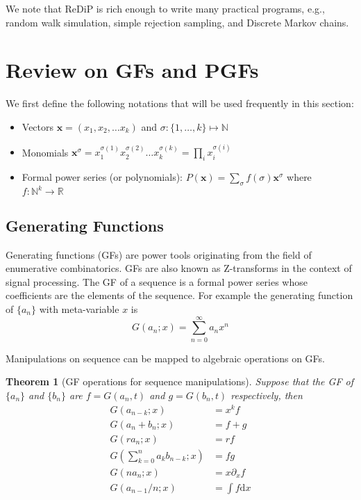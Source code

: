 \documentclass[a4paper]{article}
\newtheorem{theorem}{Theorem}[section]
\begin{document}
We note that ReDiP is rich enough to write many practical programs, e.g., random walk simulation, simple rejection sampling, and Discrete Markov chains.

\section{Review on GFs and PGFs}

We first define the following notations that will be used frequently in this section:

\begin{itemize}
	\item Vectors \(\mathbf{x} = (x_1,x_2,\ldots x_k)\) and \(\sigma: \{1,\ldots,k\}\mapsto \mathbb{N}\)
	\item Monomials \(\mathbf{x}^\sigma = x_1^{\sigma(1)} x_2^{\sigma(2)} \ldots x_k^{\sigma(k)} = \prod_i x_i^{\sigma(i)}\)
	\item Formal power series (or polynomials): \(P(\mathbf{x}) = \sum_{\sigma} f(\sigma) \mathbf{x}^\sigma\) where \(f: \mathbb{N}^k\to \mathbb{R}\)
\end{itemize}

\subsection{Generating Functions}

Generating functions\cite{gfbook} (GFs) are power tools originating from the field of enumerative combinatorics.
GFs are also known as Z-transforms in the context of signal processing.
The GF of a sequence is a formal power series whose coefficients are the elements of the sequence. For example the generating function of \(\{a_n\}\) with meta-variable \(x\) is
\[
	G(a_n; x) = \sum_{n=0}^\infty a_n x^n
\]

Manipulations on sequence can be mapped to algebraic operations on GFs.
\begin{theorem}[GF operations for sequence manipulations]
	Suppose that the GF of \(\{a_n\}\) and \(\{b_n\}\) are \(f=G(a_n,t)\) and \(g=G(b_n,t)\) respectively, then
	\begin{align*}
		G\left(a_{n-k}; x\right)                     & = x^k f              \\
		G\left(a_{n} + b_{n}; x\right)               & = f+g                \\
		G\left(r a_{n}; x\right)                     & = r f                \\
		G\left(\sum_{k=0}^{n} a_{k}b_{n-k}; x\right) & = fg                 \\
		G\left(n a_n; x\right)                       & = x \partial_x f     \\
		G\left(a_{n-1}/n; x\right)                   & = \int f \mathrm{d}x \\
	\end{align*}
\end{theorem}
\end{document}
